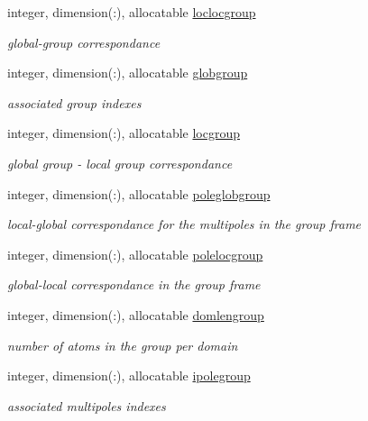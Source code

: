 \begin{DoxyCompactItemize}
integer, dimension(\-:), allocatable \hyperlink{classgroup_a175e13a44968b14d1359994c23165371}{loclocgroup}
\begin{DoxyCompactList}\small\item\em global-\/group correspondance \end{DoxyCompactList}\item 
integer, dimension(\-:), allocatable \hyperlink{classgroup_a98fb8adde914358d37ad222e748ac034}{globgroup}
\begin{DoxyCompactList}\small\item\em associated group indexes \end{DoxyCompactList}\item 
integer, dimension(\-:), allocatable \hyperlink{classgroup_af5c355551ec947f259a2e56f5be89279}{locgroup}
\begin{DoxyCompactList}\small\item\em global group -\/ local group correspondance \end{DoxyCompactList}\item 
integer, dimension(\-:), allocatable \hyperlink{classgroup_aab1eab4d8d77b04b00795dbb570b15f0}{poleglobgroup}
\begin{DoxyCompactList}\small\item\em local-\/global correspondance for the multipoles in the group frame \end{DoxyCompactList}\item 
integer, dimension(\-:), allocatable \hyperlink{classgroup_a788c0d37b32a692a72d0fd139bf52427}{polelocgroup}
\begin{DoxyCompactList}\small\item\em global-\/local correspondance in the group frame \end{DoxyCompactList}\item 
integer, dimension(\-:), allocatable \hyperlink{classgroup_a9d836ef816d6142460acb09ffd014c39}{domlengroup}
\begin{DoxyCompactList}\small\item\em number of atoms in the group per domain \end{DoxyCompactList}\item 
integer, dimension(\-:), allocatable \hyperlink{classgroup_af86e4e989b87c7c2419c57f6d2b776a0}{ipolegroup}
\begin{DoxyCompactList}\small\item\em associated multipoles indexes \end{DoxyCompactList}\item 

\end{DoxyCompactItemize}
